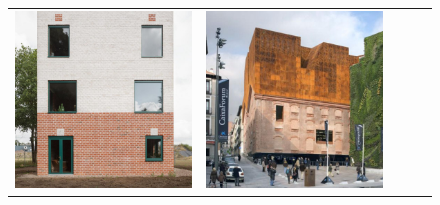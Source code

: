 \begin{figure}[H]
{\begin{tabular}{@{}ccccc@{}}
      \includegraphics[width=\linewidth]{Images/LoRAs/Geleding/Training_images/6.jpg} &
      \includegraphics[width=\linewidth]{Images/LoRAs/Geleding/Training_images/7.jpg} &

\end{tabular}}
\end{figure}
